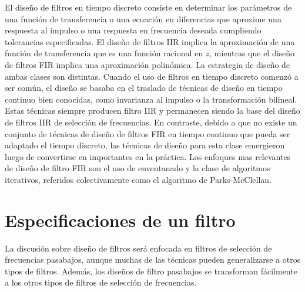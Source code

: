 \documentclass[a4paper]{report}
\begin{document}
El diseño de filtros en tiempo discreto consiste en determinar los parámetros de una función de transferencia o una ecuación en diferencias que aproxime una respuesta al impulso o una respuesta en frecuencia deseada cumpliendo tolerancias especificadas. El diseño de filtros IIR implica la aproximación de una función de transferencia que es una función racional en \(z\), mientras que el diseño de filtros FIR implica una aproximación polinómica. La estrategia de diseño de ambas clases son distintas. Cuando el uso de filtros en tiempo discreto comenzó a ser común, el diseño se basaba en el traslado de técnicas de diseño en tiempo continuo bien conocidas, como invarianza al impulso o la transformación bilineal. Estas técnicas siempre producen filtro IIR y permanecen siendo la base del diseño de filtros IIR de selección de frecuencias. En contraste, debido a que no existe un conjunto de técnicas de diseño de filtros FIR en tiempo continuo que pueda ser adaptado el tiempo discreto, las técnicas de diseño para esta clase emergieron luego de convertirse en importantes en la práctica. Los enfoques mas relevantes de diseño de filtro FIR son el uso de enventanado y la clase de algoritmos iterativos, referidos colectivamente como el algoritmo de Parks-McClellan.

\section{Especificaciones de un filtro}

La discusión sobre diseño de filtros será enfocada en filtros de selección de frecuencias pasabajos, aunque muchas de las técnicas pueden generalizarse a otros tipos de filtros. Además, los diseños de filtro pasabajos se transforman fácilmente a los otros tipos de filtros de selección de frecuencias.
\end{document}
